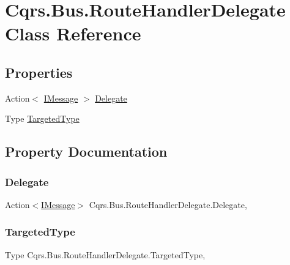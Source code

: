 \hypertarget{classCqrs_1_1Bus_1_1RouteHandlerDelegate}{}\section{Cqrs.\+Bus.\+Route\+Handler\+Delegate Class Reference}
\label{classCqrs_1_1Bus_1_1RouteHandlerDelegate}
\subsection*{Properties}
\begin{DoxyCompactItemize}
\item 
Action$<$ \hyperlink{interfaceCqrs_1_1Messages_1_1IMessage}{I\+Message} $>$ \hyperlink{classCqrs_1_1Bus_1_1RouteHandlerDelegate_acf8ba9d433498b2c49bc556cef3a7512}{Delegate}
\item 
Type \hyperlink{classCqrs_1_1Bus_1_1RouteHandlerDelegate_a2acba9d07b00b0d52290b3b7839a4eb2}{Targeted\+Type}
\end{DoxyCompactItemize}


\subsection{Property Documentation}
\mbox{\label{classCqrs_1_1Bus_1_1RouteHandlerDelegate_acf8ba9d433498b2c49bc556cef3a7512}} 
\subsubsection{\texorpdfstring{Delegate}{Delegate}}
{\footnotesize\ttfamily Action$<$\hyperlink{interfaceCqrs_1_1Messages_1_1IMessage}{I\+Message}$>$ Cqrs.\+Bus.\+Route\+Handler\+Delegate.\+Delegate\hspace{0.3cm}{\ttfamily [get]}, {\ttfamily [set]}}

\mbox{\label{classCqrs_1_1Bus_1_1RouteHandlerDelegate_a2acba9d07b00b0d52290b3b7839a4eb2}} 
\subsubsection{\texorpdfstring{Targeted\+Type}{TargetedType}}
{\footnotesize\ttfamily Type Cqrs.\+Bus.\+Route\+Handler\+Delegate.\+Targeted\+Type\hspace{0.3cm}{\ttfamily [get]}, {\ttfamily [set]}}

